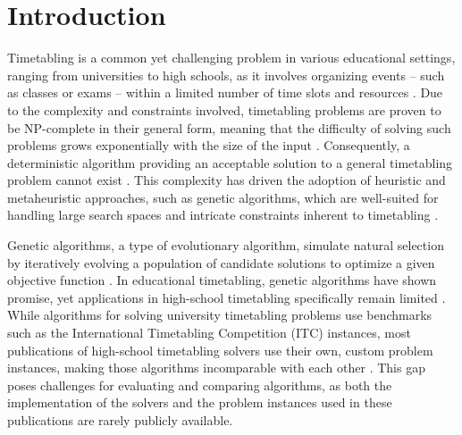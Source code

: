 \documentclass[english,examples]{isasthesis}
\begin{document}
\cleardoublepage

\maketoc


\chapter{Introduction}
Timetabling is a common yet challenging problem in various educational settings,
ranging from universities to high schools, as it involves organizing events
-- such as classes or exams -- within a limited number of time slots and
resources \cite{kingston2013educational}.
Due to the complexity and constraints involved, timetabling problems are proven
to be NP-complete in their general form, meaning that the difficulty of solving
such problems grows exponentially with the size of the input
\cite{Beligiannis2009}.
Consequently, a deterministic algorithm providing an acceptable solution to a
general timetabling problem cannot exist \cite{Beligiannis2008}.
This complexity has driven the adoption of heuristic and metaheuristic
approaches, such as genetic algorithms, which are well-suited for handling
large search spaces and intricate constraints inherent to timetabling
\cite{Beligiannis2009,quaer2024survey}.

Genetic algorithms, a type of evolutionary algorithm, simulate natural selection
by iteratively evolving a population of candidate solutions to optimize a given
objective function \cite{goldberg1989,Katoch2021}.
In educational timetabling, genetic algorithms have shown promise, yet
applications in high-school timetabling specifically remain limited
\cite{quaer2024survey}.
While algorithms for solving university timetabling problems use benchmarks
such as the International Timetabling Competition (ITC) instances, most
publications of high-school timetabling solvers use their own, custom problem
instances, making those algorithms incomparable with each other
\cite{quaer2024survey}.
This gap poses challenges for evaluating and comparing algorithms, as both the
implementation of the solvers and the problem instances used in these
publications are rarely publicly available.
\end{document}
